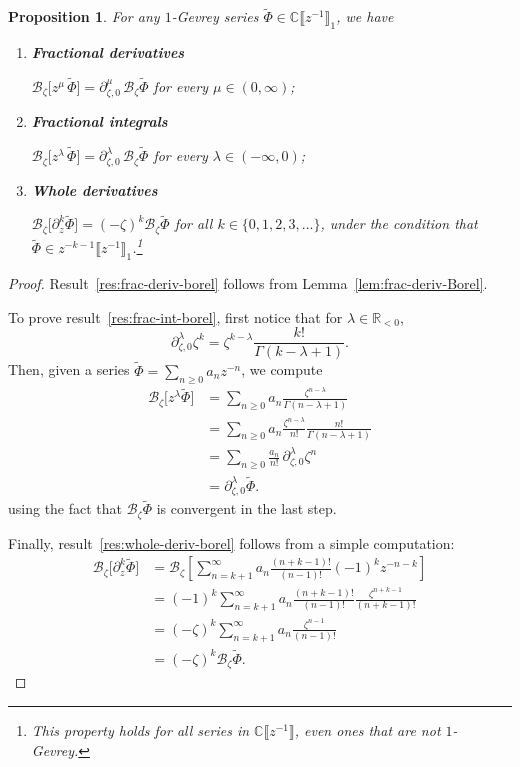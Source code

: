 \documentclass{article}
\newcommand{\R}{\mathbb{R}}
\newcommand{\C}{\mathbb{C}}
\newcommand{\series}[1]{\tilde{#1}}
\newcommand{\fracderiv}[3]{\partial^{#1}_{#2, #3}}
\newcommand{\borel}{\mathcal{B}}
\theoremstyle{definition}
\theoremstyle{plain}
\newtheorem{prop}[definition]{Proposition}
\begin{document}
\begin{prop}\label{prop:frac-der-int-borel}
For any $1$-Gevrey series $\series{\Phi}\in\C\llbracket z^{-1}\rrbracket_1$, we have
\begin{enumerate}[label=(\roman*)]
\item\label{res:frac-deriv-borel} \textbf{Fractional derivatives}

$\borel_\zeta\big[ z^\mu \, \series{\Phi}\big]=\fracderiv{\mu}{\zeta}{0}\, \borel_\zeta\series{\Phi}$ for every $\mu\in(0, \infty)$;
\item\label{res:frac-int-borel} \textbf{Fractional integrals}

$\borel_\zeta\big[z^\lambda\, \series{\Phi}\big]=\fracderiv{\lambda}{\zeta}{0}\,\borel_\zeta\series{\Phi}$ for every $\lambda\in(-\infty, 0)$;
\item\label{res:whole-deriv-borel} \textbf{Whole derivatives}

$\borel_\zeta\big[\partial_z^{k} \series{\Phi}\big]=(-\zeta)^k\borel_\zeta\series{\Phi}$ for all $k\in\{0, 1, 2, 3, \ldots\}$, under the condition that $\series{\Phi}\in z^{-k-1}\llbracket z^{-1}\rrbracket_1$.\footnote{This property holds for all series in $\C\llbracket z^{-1}\rrbracket$, even ones that are not $1$-Gevrey.}
\end{enumerate} 
\end{prop}
\begin{proof} 
Result~\ref{res:frac-deriv-borel} follows from Lemma~\ref{lem:frac-deriv-Borel}. 

To prove result~\ref{res:frac-int-borel}, first notice that for $\lambda \in \R_{< 0}$,
\[\fracderiv{\lambda}{\zeta}{0}\zeta^{k}=\zeta^{k-\lambda}\frac{k!}{\Gamma(k-\lambda+1)}.\] 
Then, given a series $\series{\Phi} = \sum_{n\geq 0} a_n z^{-n}$, we compute
\begin{align*}
\borel_\zeta \big[z^\lambda \series{\Phi}\big] & = \sum_{n\geq 0}a_n\frac{\zeta^{n-\lambda}}{\Gamma(n-\lambda+1)} \\
& = \sum_{n\geq 0}a_n\frac{\zeta^{n-\lambda}}{n!}\frac{n!}{\Gamma(n-\lambda+1)} \\
& = \sum_{n\geq 0} \frac{a_n}{n!}\,\fracderiv{\lambda}{\zeta}{0}\zeta^n \\
& = \fracderiv{\lambda}{\zeta}{0}\series{\Phi}.
\end{align*}
using the fact that $\borel_\zeta\series{\Phi}$ is convergent in the last step.

Finally, result~\ref{res:whole-deriv-borel} follows from a simple computation: 
\begin{align*}
\borel_\zeta\big[\partial_z^k\series{\Phi}\big]&=\borel_\zeta\left[\sum_{n=k+1}^\infty a_n \frac{(n+k-1)!}{(n-1)!} (-1)^{k} z^{-n-k}\right]\\
&=(-1)^k \sum_{n=k+1}^\infty a_n \frac{(n+k-1)!}{(n-1)!}\frac{\zeta^{n+k-1}}{(n+k-1)!}\\
&=(-\zeta)^k\sum_{n=k+1}^\infty a_n \frac{\zeta^{n-1}}{(n-1)!}\\
&=(-\zeta)^k\borel_\zeta \series{\Phi}.
\end{align*}
\end{proof}
%
\end{document}
